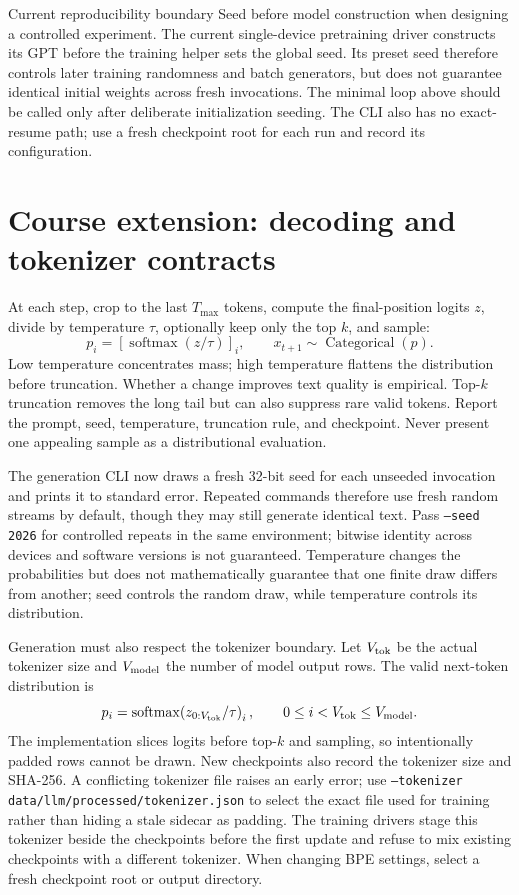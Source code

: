 \documentclass[11pt]{article}
\newcommand{\softmax}{\operatorname{softmax}}
\begin{document}
\begin{studybox}{Current reproducibility boundary}
Seed before model construction when designing a controlled experiment. The
current single-device pretraining driver constructs its GPT before the training
helper sets the global seed. Its preset seed therefore controls later training
randomness and batch generators, but does not guarantee identical initial
weights across fresh invocations. The minimal loop above should be called only
after deliberate initialization seeding. The CLI also has no exact-resume path;
use a fresh checkpoint root for each run and record its configuration.
\end{studybox}

\section{Course extension: decoding and tokenizer contracts}

At each step, crop to the last $T_{\max}$ tokens, compute the final-position
logits $z$, divide by temperature $\tau$, optionally keep only the top $k$, and
sample:
\[
p_i=[\softmax(z/\tau)]_i,\qquad x_{t+1}\sim\operatorname{Categorical}(p).
\]
Low temperature concentrates mass; high temperature flattens the distribution
before truncation. Whether a change improves text quality is empirical.
Top-$k$ truncation removes the long tail but can also suppress rare valid
tokens. Report the prompt, seed, temperature, truncation rule, and checkpoint.
Never present one appealing sample as a distributional evaluation.

The generation CLI now draws a fresh 32-bit seed for each unseeded invocation
and prints it to standard error. Repeated commands therefore use fresh random
streams by default, though they may still generate identical text. Pass
\texttt{--seed 2026} for controlled repeats in the same environment; bitwise
identity across devices and software versions is not guaranteed.
Temperature changes the probabilities but does not mathematically
guarantee that one finite draw differs from another; seed controls the random
draw, while temperature controls its distribution.

Generation must also respect the tokenizer boundary. Let $V_{\rm tok}$ be the
actual tokenizer size and $V_{\rm model}$ the number of model output rows. The
valid next-token distribution is
\[
p_i=\softmax\!\left(z_{0:V_{\rm tok}}/\tau\right)_i,
\qquad 0\le i<V_{\rm tok}\le V_{\rm model}.
\]
The implementation slices logits before top-$k$ and sampling, so intentionally
padded rows cannot be drawn. New checkpoints also record the tokenizer size and
SHA-256. A conflicting tokenizer file raises an early error; use
\texttt{--tokenizer data/llm/processed/tokenizer.json} to select the exact file
used for training rather than hiding a stale sidecar as padding.
The training drivers stage this tokenizer beside the checkpoints before the
first update and refuse to mix existing checkpoints with a different tokenizer.
When changing BPE settings, select a fresh checkpoint root or output directory.
\end{document}
